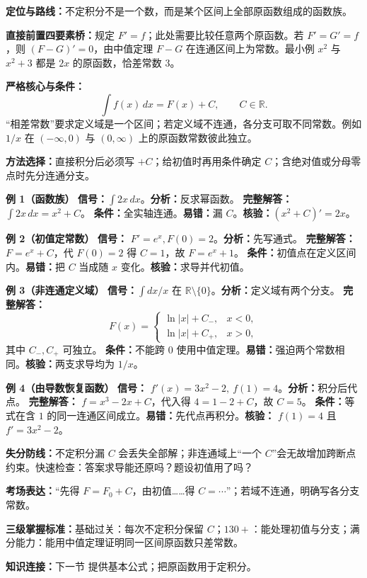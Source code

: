 \begin{knowledgeBox}
\textbf{定位与路线：}不定积分不是一个数，而是某个区间上全部原函数组成的函数族。

\textbf{直接前置四要素桥：}规定 \(F'=f\)；此处需要比较任意两个原函数。若 \(F'=G'=f\)，则 \((F-G)'=0\)，由中值定理 \(F-G\) 在连通区间上为常数。最小例 \(x^2\) 与 \(x^2+3\) 都是 \(2x\) 的原函数，恰差常数 \(3\)。

\textbf{严格核心与条件：}
\[
\int f(x)\,dx=F(x)+C,\qquad C\in\mathbb R.
\]
“相差常数”要求定义域是一个区间；若定义域不连通，各分支可取不同常数。例如 \(1/x\) 在 \((-\infty,0)\) 与 \((0,\infty)\) 上的原函数常数彼此独立。

\textbf{方法选择：}直接积分后必须写 \(+C\)；给初值时再用条件确定 \(C\)；含绝对值或分母零点时先分连通分支。

\textbf{例 1（函数族）}\quad
\textbf{信号：}\(\int2x\,dx\)。\textbf{分析：}反求幂函数。
\textbf{完整解答：}\(\int2x\,dx=x^2+C\)。
\textbf{条件：}全实轴连通。\textbf{易错：}漏 \(C\)。\textbf{核验：}\((x^2+C)'=2x\)。

\textbf{例 2（初值定常数）}\quad
\textbf{信号：} \(F'=e^x,F(0)=2\)。\textbf{分析：}先写通式。
\textbf{完整解答：} \(F=e^x+C\)，代 \(F(0)=2\) 得 \(C=1\)，故 \(F=e^x+1\)。
\textbf{条件：}初值点在定义区间内。\textbf{易错：}把 \(C\) 当成随 \(x\) 变化。\textbf{核验：}求导并代初值。

\textbf{例 3（非连通定义域）}\quad
\textbf{信号：}\(\int dx/x\) 在 \(\mathbb R\setminus\{0\}\)。\textbf{分析：}定义域有两个分支。
\textbf{完整解答：}
\[
F(x)=\begin{cases}\ln|x|+C_-,&x<0,\\ \ln|x|+C_+,&x>0,\end{cases}
\]
其中 \(C_-,C_+\) 可独立。
\textbf{条件：}不能跨 \(0\) 使用中值定理。\textbf{易错：}强迫两个常数相同。\textbf{核验：}两支求导均为 \(1/x\)。

\textbf{例 4（由导数恢复函数）}\quad
\textbf{信号：} \(f'(x)=3x^2-2,\ f(1)=4\)。\textbf{分析：}积分后代点。
\textbf{完整解答：} \(f=x^3-2x+C\)，代入得 \(4=1-2+C\)，故 \(C=5\)。
\textbf{条件：}等式在含 \(1\) 的同一连通区间成立。\textbf{易错：}先代点再积分。\textbf{核验：} \(f(1)=4\) 且 \(f'=3x^2-2\)。

\textbf{失分防线：}不定积分漏 \(C\) 会丢失全部解；非连通域上“一个 \(C\)”会无故增加跨断点约束。快速检查：答案求导能还原吗？题设初值用了吗？

\textbf{考场表达：}“先得 \(F=F_0+C\)，由初值……得 \(C=\cdots\)”；若域不连通，明确写各分支常数。

\textbf{三级掌握标准：}基础过关：每次不定积分保留 \(C\)；\(130+\)：能处理初值与分支；满分能力：能用中值定理证明同一区间原函数只差常数。

\textbf{知识连接：}下一节 提供基本公式；把原函数用于定积分。
\end{knowledgeBox}


